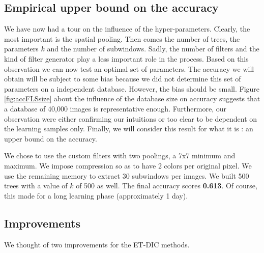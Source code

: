 \documentclass[a4paper]{report}
\begin{document}
	\subsection{\label{subsec:UpperBound}Empirical upper bound on the accuracy}
	We have now had a tour on the influence of the hyper-parameters. Clearly, the most important is the spatial pooling. Then comes the number of trees, the parameters $k$ and the number of subwindows. Sadly, the number of filters and the kind of filter generator play a less important role in the process.
	Based on this observation we can now test an optimal set of parameters. The accuracy we will obtain will be subject to some bias because we did not determine this set of parameters on a independent database. However, the bias should be small. Figure \ref{fig:accFLSsize} about the influence of the database size on accuracy suggests that a database of 40,000 images is representative enough. Furthermore, our observation were either confirming our intuitions or too clear to be dependent on the learning samples only. Finally, we will consider this result for what it is : an upper bound on the accuracy.
	\par
	We chose to use the custom filters with two poolings, a 7x7 minimum and maximum. We impose compression so as to have 2 colors per original pixel. We use the remaining memory to extract 30 subwindows per images. We built 500 trees with a value of $k$ of 500 as well. The final accuracy scores \textbf{0.613}. Of course, this made for a long learning phase (approximately 1 day).
	
	\subsection{Improvements}
	We thought of two improvements for the ET-DIC methods. 
	
\end{document}
